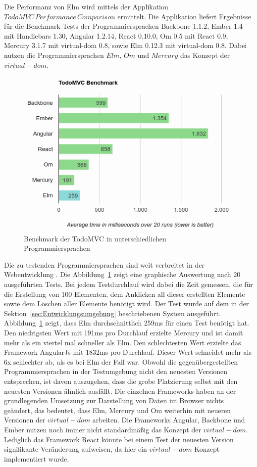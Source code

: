 Die Performanz von Elm wird mittels der Applikation $TodoMVC\,Performance\,Comparison$ ermittelt. Die Applikation liefert Ergebnisse für die Benchmark-Tests der Programmiersprachen Backbone 1.1.2, Ember 1.4 mit Handlebars 1.30, Angular 1.2.14, React 0.10.0, Om 0.5 mit React 0.9, Mercury 3.1.7 mit virtual-dom 0.8, sowie Elm 0.12.3 mit virtual-dom 0.8. Dabei nutzen die Programmiersprachen $Elm$, $Om$ und $Mercury$ das Konzept der $virtual-dom$.
\begin{figure}[ht]
\centering
\includegraphics[scale=0.6]{img/elm-benchmark-final.png}
\caption{Benchmark der TodoMVC in unterschiedlichen Programmiersprachen}\label{fig:elm-todo-benchmarks}
\end{figure}
Die zu testenden Programmiersprachen sind weit verbreitet in der Webentwicklung \cite[Vgl.]{most-used-frameworks}. Die Abbildung~\ref{fig:elm-todo-benchmarks} zeigt eine graphische Auswertung nach 20 ausgeführten Tests. Bei jedem Testdurchlauf wird dabei die Zeit gemessen, die für die Erstellung von 100 Elementen, dem Anklicken all dieser erstellten Elemente sowie dem Löschen aller Elemente benötigt wird. Der Test wurde auf dem in der Sektion~\ref{sec:Entwicklungsumgebung} beschriebenen System ausgeführt. Abbildung~\ref{fig:elm-todo-benchmarks} zeigt, dass Elm durchschnittlich 259ms für einen Test benötigt hat. Den niedrigsten Wert mit 191ms pro Durchlauf erzielte Mercury und ist damit mehr als ein viertel mal schneller als Elm. Den schlechtesten Wert erzielte das Framework AngularJs mit 1832ms pro Durchlauf. Dieser Wert schneidet mehr als 6x schlechter ab, als es bei Elm der Fall war.
Obwohl die gegenübergestellten Programmiersprachen in der Testumgebung nicht den neuesten Versionen entsprechen, ist davon auszugehen, dass die grobe Platzierung selbst mit den neuesten Versionen ähnlich ausfällt. Die einzelnen Frameworks haben an der grundlegenden Umsetzung zur Darstellung von Daten im Browser nichts geändert, das bedeutet, dass Elm, Mercury und Om weiterhin mit neueren Versionen der $virtual-dom$ arbeiten. Die Frameworks Angular, Backbone und Ember nutzen noch immer nicht standardmäßig das Konzept der $virtual-dom$. Lediglich das Framework React könnte bei einem Test der neuesten Version signifikante Veränderung aufweisen, da hier ein $virtual-dom$ Konzept implementiert wurde.
